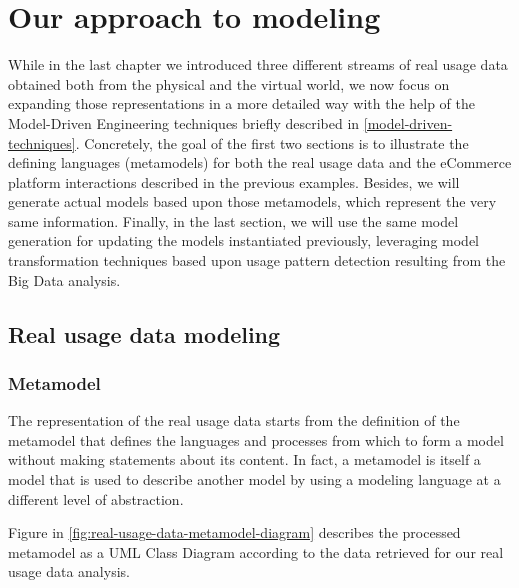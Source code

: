 \chead{}
\chapter{Our approach to modeling}

While in the last chapter we introduced three different streams of real usage data obtained both from the physical and the virtual world, we now focus on expanding those representations in a more detailed way with the help of the Model-Driven Engineering techniques briefly described in \ref{model-driven-techniques}. 
Concretely, the goal of the first two sections is to illustrate the defining languages (metamodels) for both the real usage data and the eCommerce platform interactions described in the previous examples. Besides, we will generate actual models based upon those metamodels, which represent the very same information.
Finally, in the last section, we will use the same model generation for updating the models instantiated previously, leveraging model transformation techniques based upon usage pattern detection resulting from the Big Data analysis.

\section{Real usage data modeling}

\subsection{Metamodel}

The representation of the real usage data starts from the definition of the metamodel that defines the languages and processes from which to form a model without making statements about its content. In fact, a metamodel is itself a model that is used to describe another model by using a modeling language at a different level of abstraction.  

Figure in \ref{fig:real-usage-data-metamodel-diagram} describes the processed metamodel as a UML Class Diagram according to the data retrieved for our real usage data analysis.

